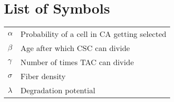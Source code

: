 \chapter*{List of Symbols}

\begin{tabular}{  l l    }
$\alpha$    &      Probability of a cell in CA getting selected\\
$\beta$    &      Age after which CSC can divide\\
$\gamma$    &      Number of times TAC can divide\\
$\sigma$    &      Fiber density\\
$\lambda$    &      Degradation potential\\
\end{tabular}


